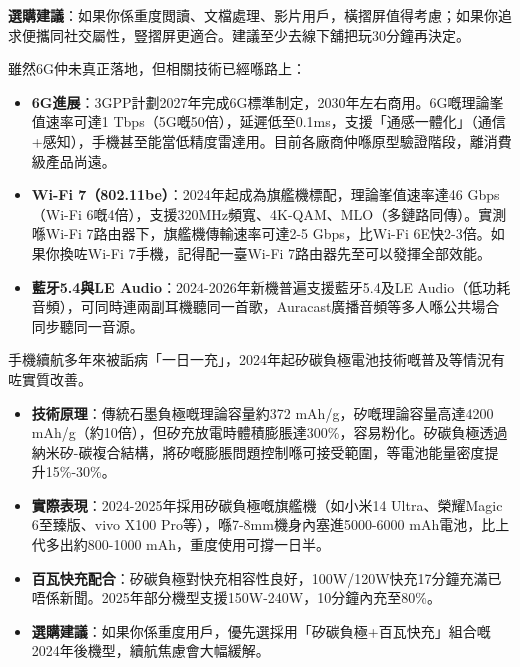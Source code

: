 \textbf{選購建議}：如果你係重度閲讀、文檔處理、影片用戶，橫摺屏值得考慮；如果你追求便攜同社交屬性，豎摺屏更適合。建議至少去線下舖把玩30分鐘再決定。


雖然6G仲未真正落地，但相關技術已經喺路上：

\begin{itemize}
  \item \textbf{6G進展}：3GPP計劃2027年完成6G標準制定，2030年左右商用。6G嘅理論峯值速率可達1 Tbps（5G嘅50倍），延遲低至0.1ms，支援「通感一體化」（通信+感知），手機甚至能當低精度雷達用。目前各廠商仲喺原型驗證階段，離消費級產品尚遠。
  \item \textbf{Wi-Fi 7（802.11be）}：2024年起成為旗艦機標配，理論峯值速率達46 Gbps（Wi-Fi 6嘅4倍），支援320MHz頻寬、4K-QAM、MLO（多鏈路同傳）。實測喺Wi-Fi 7路由器下，旗艦機傳輸速率可達2-5 Gbps，比Wi-Fi 6E快2-3倍。如果你換咗Wi-Fi 7手機，記得配一臺Wi-Fi 7路由器先至可以發揮全部效能。
  \item \textbf{藍牙5.4與LE Audio}：2024-2026年新機普遍支援藍牙5.4及LE Audio（低功耗音頻），可同時連兩副耳機聽同一首歌，Auracast廣播音頻等多人喺公共場合同步聽同一音源。
\end{itemize}


手機續航多年來被詬病「一日一充」，2024年起矽碳負極電池技術嘅普及等情況有咗實質改善。

\begin{itemize}
  \item \textbf{技術原理}：傳統石墨負極嘅理論容量約372 mAh/g，矽嘅理論容量高達4200 mAh/g（約10倍），但矽充放電時體積膨脹達300\%，容易粉化。矽碳負極透過納米矽-碳複合結構，將矽嘅膨脹問題控制喺可接受範圍，等電池能量密度提升15\%-30\%。
  \item \textbf{實際表現}：2024-2025年採用矽碳負極嘅旗艦機（如小米14 Ultra、榮耀Magic 6至臻版、vivo X100 Pro等），喺7-8mm機身內塞進5000-6000 mAh電池，比上代多出約800-1000 mAh，重度使用可撐一日半。
  \item \textbf{百瓦快充配合}：矽碳負極對快充相容性良好，100W/120W快充17分鐘充滿已唔係新聞。2025年部分機型支援150W-240W，10分鐘內充至80\%。
  \item \textbf{選購建議}：如果你係重度用戶，優先選採用「矽碳負極+百瓦快充」組合嘅2024年後機型，續航焦慮會大幅緩解。
\end{itemize}


